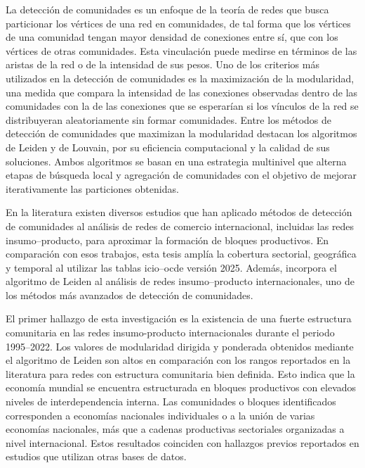 La detección de comunidades es un enfoque de la teoría de redes que busca particionar los vértices de una red en comunidades, de tal forma que los vértices de una comunidad tengan mayor densidad de conexiones entre sí, que con los vértices de otras comunidades. Esta vinculación puede medirse en términos de las aristas de la red o de la intensidad de sus pesos. Uno de los criterios más utilizados en la detección de comunidades es la maximización de la modularidad, una medida que compara la intensidad de las conexiones observadas dentro de las comunidades con la de las conexiones que se esperarían si los vínculos de la red se distribuyeran aleatoriamente sin formar comunidades. Entre los métodos de detección de comunidades que maximizan la modularidad destacan los algoritmos de Leiden y de Louvain, por su eficiencia computacional y la calidad de sus soluciones. Ambos algoritmos se basan en una estrategia multinivel que alterna etapas de búsqueda local y agregación de comunidades con el objetivo de mejorar iterativamente las particiones obtenidas.

En la literatura existen diversos estudios que han aplicado métodos de detección de comunidades al análisis de redes de comercio internacional, incluidas las redes insumo--producto, para aproximar la formación de bloques productivos. En comparación con esos trabajos, esta tesis amplía la cobertura sectorial, geográfica y temporal al utilizar las tablas \gls{icio}--\gls{ocde} versión 2025. Además, incorpora el algoritmo de Leiden al análisis de redes insumo--producto internacionales, uno de los métodos más avanzados de detección de comunidades.

El primer hallazgo de esta investigación es la existencia de una fuerte estructura comunitaria en las redes insumo-producto internacionales durante el periodo 1995--2022. Los valores de modularidad dirigida y ponderada obtenidos mediante el algoritmo de Leiden son altos en comparación con los rangos reportados en la literatura para redes con estructura comunitaria bien definida. Esto indica que la economía mundial se encuentra estructurada en bloques productivos con elevados niveles de interdependencia interna. Las comunidades o bloques identificados corresponden a economías nacionales individuales o a la unión de varias economías nacionales, más que a cadenas productivas sectoriales organizadas a nivel internacional. Estos resultados coinciden con hallazgos previos reportados en estudios que utilizan otras bases de datos.

